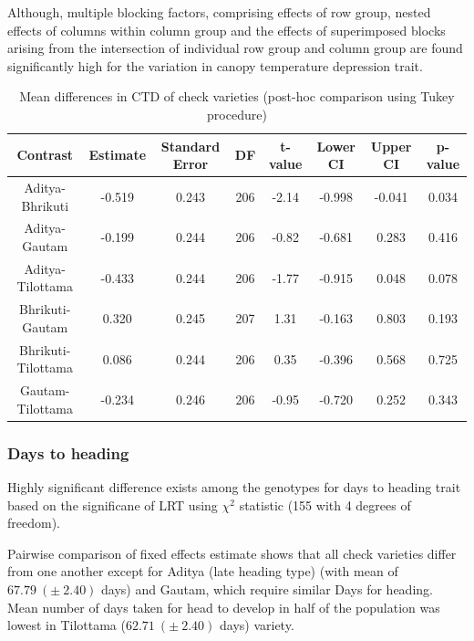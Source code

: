 \documentclass[12pt,oneside]{dukestatscithesis} %
\theoremstyle{definition}
\theoremstyle{definition}
\theoremstyle{definition}
\theoremstyle{remark}
\begin{document}
Although, multiple blocking factors, comprising effects of row group,
nested effects of columns within column group and the effects of
superimposed blocks arising from the intersection of individual row
group and column group are found significantly high for the variation in
canopy temperature depression trait.
\begin{table}[H]

\caption{\label{tab:other-meanconf-tab5}Mean differences in CTD of check varieties (post-hoc comparison using Tukey procedure)}
\centering
\begin{tabular}[t]{cccccccc}
\toprule
Contrast & Estimate & Standard Error & DF & t-value & Lower CI & Upper CI & p-value\\
\midrule
Aditya-Bhrikuti & -0.519 & 0.243 & 206 & -2.14 & -0.998 & -0.041 & 0.034\\
Aditya-Gautam & -0.199 & 0.244 & 206 & -0.82 & -0.681 & 0.283 & 0.416\\
Aditya-Tilottama & -0.433 & 0.244 & 206 & -1.77 & -0.915 & 0.048 & 0.078\\
Bhrikuti-Gautam & 0.320 & 0.245 & 207 & 1.31 & -0.163 & 0.803 & 0.193\\
Bhrikuti-Tilottama & 0.086 & 0.244 & 206 & 0.35 & -0.396 & 0.568 & 0.725\\
Gautam-Tilottama & -0.234 & 0.246 & 206 & -0.95 & -0.720 & 0.252 & 0.343\\
\bottomrule
\end{tabular}
\end{table}
\subsubsection{Days to heading}\label{days-to-heading}

Highly significant difference exists among the genotypes for days to
heading trait based on the significane of LRT using \(\chi^2\) statistic
(155 with 4 degrees of freedom).

Pairwise comparison of fixed effects estimate shows that all check
varieties differ from one another except for Aditya (late heading type)
(with mean of \(67.79\ (\pm\ 2.40)\) days) and Gautam, which require
similar Days for heading. Mean number of days taken for head to develop
in half of the population was lowest in Tilottama
(\(62.71\ (\pm\ 2.40)\) days) variety.
\end{document}

